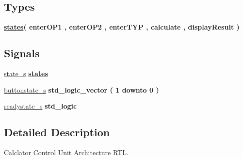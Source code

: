 \subsection*{Types}
 \begin{DoxyCompactItemize}
\item 
{\bfseries \hyperlink{classcalc__ctrl_1_1rtl_a8bc0dac7a50e3f941ae2eb6dc9a2a814}{states}{\bfseries \textcolor{vhdlchar}{(}\textcolor{vhdlchar}{ }\textcolor{vhdlchar}{enter\+O\+P1}\textcolor{vhdlchar}{ }\textcolor{vhdlchar}{,}\textcolor{vhdlchar}{ }\textcolor{vhdlchar}{enter\+O\+P2}\textcolor{vhdlchar}{ }\textcolor{vhdlchar}{,}\textcolor{vhdlchar}{ }\textcolor{vhdlchar}{enter\+T\+YP}\textcolor{vhdlchar}{ }\textcolor{vhdlchar}{,}\textcolor{vhdlchar}{ }\textcolor{vhdlchar}{calculate}\textcolor{vhdlchar}{ }\textcolor{vhdlchar}{,}\textcolor{vhdlchar}{ }\textcolor{vhdlchar}{display\+Result}\textcolor{vhdlchar}{ }\textcolor{vhdlchar}{)}\textcolor{vhdlchar}{ }}} 
\end{DoxyCompactItemize}
\subsection*{Signals}
 \begin{DoxyCompactItemize}
\item 
\hyperlink{classcalc__ctrl_1_1rtl_a17a79c8d34e649e8b8cee04947ed297d}{state\+\_\+s} {\bfseries {\bfseries \hyperlink{classcalc__ctrl_1_1rtl_a8bc0dac7a50e3f941ae2eb6dc9a2a814}{states}} \textcolor{vhdlchar}{ }} 
\item 
\hyperlink{classcalc__ctrl_1_1rtl_af28493abe45f5efc5d9964a4858da804}{buttonstate\+\_\+s} {\bfseries \textcolor{comment}{std\+\_\+logic\+\_\+vector}\textcolor{vhdlchar}{ }\textcolor{vhdlchar}{(}\textcolor{vhdlchar}{ }\textcolor{vhdlchar}{ } \textcolor{vhdldigit}{1} \textcolor{vhdlchar}{ }\textcolor{keywordflow}{downto}\textcolor{vhdlchar}{ }\textcolor{vhdlchar}{ } \textcolor{vhdldigit}{0} \textcolor{vhdlchar}{ }\textcolor{vhdlchar}{)}\textcolor{vhdlchar}{ }} 
\item 
\hyperlink{classcalc__ctrl_1_1rtl_a3e1f575cd6ec8066c23692c007e16457}{readystate\+\_\+s} {\bfseries \textcolor{comment}{std\+\_\+logic}\textcolor{vhdlchar}{ }} 
\end{DoxyCompactItemize}


\subsection{Detailed Description}
Calclator Control Unit Architecture R\+TL. 


